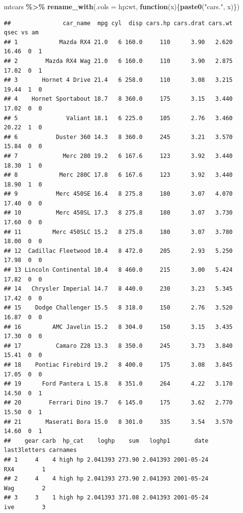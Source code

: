 \documentclass[
]{article}
\newenvironment{Shaded}{\begin{snugshade}}{\end{snugshade}}
\newcommand{\AttributeTok}[1]{\textcolor[rgb]{0.13,0.29,0.53}{#1}}
\newcommand{\ControlFlowTok}[1]{\textcolor[rgb]{0.13,0.29,0.53}{\textbf{#1}}}
\newcommand{\FunctionTok}[1]{\textcolor[rgb]{0.13,0.29,0.53}{\textbf{#1}}}
\newcommand{\NormalTok}[1]{#1}
\newcommand{\SpecialCharTok}[1]{\textcolor[rgb]{0.81,0.36,0.00}{\textbf{#1}}}
\newcommand{\StringTok}[1]{\textcolor[rgb]{0.31,0.60,0.02}{#1}}
\begin{document}
\begin{Shaded}
\begin{Highlighting}[]
\NormalTok{mtcars }\SpecialCharTok{\%\textgreater{}\%} \FunctionTok{rename\_with}\NormalTok{(}\AttributeTok{.cols =}\NormalTok{ hp}\SpecialCharTok{:}\NormalTok{wt, }\ControlFlowTok{function}\NormalTok{(x)\{}\FunctionTok{paste0}\NormalTok{(}\StringTok{"cars."}\NormalTok{, x)\})}
\end{Highlighting}
\end{Shaded}

\begin{verbatim}
##               car_name  mpg cyl  disp cars.hp cars.drat cars.wt  qsec vs am
## 1            Mazda RX4 21.0   6 160.0     110      3.90   2.620 16.46  0  1
## 2        Mazda RX4 Wag 21.0   6 160.0     110      3.90   2.875 17.02  0  1
## 3       Hornet 4 Drive 21.4   6 258.0     110      3.08   3.215 19.44  1  0
## 4    Hornet Sportabout 18.7   8 360.0     175      3.15   3.440 17.02  0  0
## 5              Valiant 18.1   6 225.0     105      2.76   3.460 20.22  1  0
## 6           Duster 360 14.3   8 360.0     245      3.21   3.570 15.84  0  0
## 7             Merc 280 19.2   6 167.6     123      3.92   3.440 18.30  1  0
## 8            Merc 280C 17.8   6 167.6     123      3.92   3.440 18.90  1  0
## 9           Merc 450SE 16.4   8 275.8     180      3.07   4.070 17.40  0  0
## 10          Merc 450SL 17.3   8 275.8     180      3.07   3.730 17.60  0  0
## 11         Merc 450SLC 15.2   8 275.8     180      3.07   3.780 18.00  0  0
## 12  Cadillac Fleetwood 10.4   8 472.0     205      2.93   5.250 17.98  0  0
## 13 Lincoln Continental 10.4   8 460.0     215      3.00   5.424 17.82  0  0
## 14   Chrysler Imperial 14.7   8 440.0     230      3.23   5.345 17.42  0  0
## 15    Dodge Challenger 15.5   8 318.0     150      2.76   3.520 16.87  0  0
## 16         AMC Javelin 15.2   8 304.0     150      3.15   3.435 17.30  0  0
## 17          Camaro Z28 13.3   8 350.0     245      3.73   3.840 15.41  0  0
## 18    Pontiac Firebird 19.2   8 400.0     175      3.08   3.845 17.05  0  0
## 19      Ford Pantera L 15.8   8 351.0     264      4.22   3.170 14.50  0  1
## 20        Ferrari Dino 19.7   6 145.0     175      3.62   2.770 15.50  0  1
## 21       Maserati Bora 15.0   8 301.0     335      3.54   3.570 14.60  0  1
##    gear carb  hp_cat    loghp    sum   loghp1       date last3letters carnames
## 1     4    4 high hp 2.041393 273.90 2.041393 2001-05-24          RX4        1
## 2     4    4 high hp 2.041393 273.90 2.041393 2001-05-24          Wag        2
## 3     3    1 high hp 2.041393 371.08 2.041393 2001-05-24          ive        3

\end{verbatim}
\end{document}
